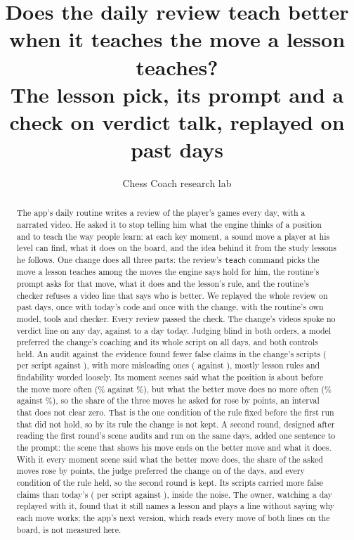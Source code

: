 \documentclass[11pt]{article}
\title{Does the daily review teach better when it teaches the move a lesson teaches?\\[0.3em]
\large The lesson pick, its prompt and a check on verdict talk, replayed on \Days{} past days}
\author{Chess Coach research lab}
\date{}
\begin{document}
\maketitle

\begin{abstract}
The app's daily routine writes a review of the player's games every day, with a narrated video.
He asked it to stop telling him what the engine thinks of a position and to teach the way people
learn: at each key moment, a sound move a player at his level can find, what it does on the board,
and the idea behind it from the study lessons he follows. One change does all three parts: the
review's \texttt{teach} command picks the move a lesson teaches among the moves the engine says
hold for him, the routine's prompt asks for that move, what it does and the lesson's rule, and the
routine's checker refuses a video line that says who is better. We replayed the whole review on
\Days{} past days, once with today's code and once with the change, with the routine's own model,
tools and checker. Every review passed the check. The change's videos spoke no verdict line on any
day, against \BaseVerdictMin{} to \BaseVerdictMax{} a day today. Judging blind in both orders, a
model preferred the change's coaching and its whole script on all \Days{} days, and both controls
held. An audit against the evidence found fewer false claims in the change's scripts
(\CandFalse{} per script against \BaseFalse), with more misleading ones (\CandMisleading{} against
\BaseMisleading), mostly lesson rules and findability worded loosely. Its moment scenes said what
the position is about before the move more often (\CandAboutFirst\% against \BaseAboutFirst\%), but
what the better move does no more often (\CandPurposeNamed\% against \BasePurposeNamed\%), so the
share of the three moves he asked for rose by \AskedDiff{} points, an interval that does not clear
zero. That is the one condition of the rule fixed before the first run that did not hold, so by its
rule the change is not kept. A second round, designed after reading the first round's scene audits
and run on the same days, added one sentence to the prompt: the scene that shows his move ends on
the better move and what it does. With it every moment scene said what the better move does, the
share of the asked moves rose by \TwoAskedDiff{} points, the judge preferred the change on
\TwoCoachingWins{} of the \Days{} days, and every condition of the rule held, so the second round is
kept. Its scripts carried more false claims than today's (\TwoFalse{} per script against
\BaseFalse), inside the noise. The owner,
watching a day replayed with it, found that it still names a lesson and plays a line without saying
why each move works; the app's next version, which reads every move of both lines on the board, is
not measured here.
\end{abstract}
\end{document}
